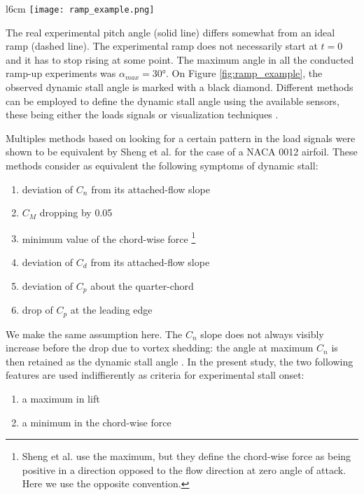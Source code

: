 \begin{wrapfigure}{l}{6cm}
	\centering
	\texttt{[image: ramp\_example.png]}
	\caption{Time evolution of the experimental angle of attack for $\alphadot=10\si{\degree \per \second}$, $r=0.026$}
	\label{fig:ramp_example}
\end{wrapfigure}

The real experimental pitch angle (solid line) differs somewhat from an ideal ramp (dashed line). The experimental ramp does not necessarily start at $t=0$ and it has to stop rising at some point. The maximum angle in all the conducted ramp-up experiments was $\alpha_{max}=\ang{30}$. On Figure \ref{fig:ramp_example}, the observed dynamic stall angle is marked with a black diamond. Different methods can be employed to define the dynamic stall angle using the available sensors, these being either the loads signals \cite{sheng_new_2006} or visualization techniques \cite{mulleners_coherent_2010}. 

Multiples methods based on looking for a certain pattern in the load signals were shown to be equivalent by Sheng et al. \cite{sheng_new_2006} for the case of a NACA 0012 airfoil. These methods consider as equivalent the following symptoms of dynamic stall: 

\begin{enumerate}
	\item deviation of $C_n$ from its attached-flow slope
	\item $C_M$ dropping by 0.05 
	\item minimum value of the chord-wise force \footnote{Sheng et al. use the maximum, but they define the chord-wise force as being positive in a direction opposed to the flow direction at zero angle of attack. Here we use the opposite convention.}
	\item deviation of $C_d$ from its attached-flow slope
	\item deviation of $C_p$ about the quarter-chord
	\item drop of $C_p$ at the leading edge
\end{enumerate}

We make the same assumption here. The $C_n$ slope does not always visibly increase before the drop due to vortex shedding: the angle at maximum $C_n$ is then retained as the dynamic stall angle \cite{mulleners_dynamic_2013}. In the present study, the two following features are used indiffierently as criteria for experimental stall onset:

\begin{enumerate}
	\item a maximum in lift
	\item a minimum in the chord-wise force
\end{enumerate} 

